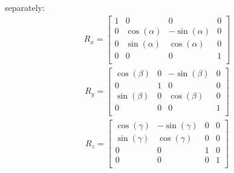 \documentclass[11pt]{report}
\begin{document}
separately:
\begin{align*}
R_x = 
  \begin{bmatrix}
  1             & 0            & 0             & 0 \\
  0             & \cos(\alpha) & -\sin(\alpha) & 0 \\
  0             & \sin(\alpha) & \cos(\alpha)  & 0 \\
  0             & 0            & 0             & 1 \\  
  \end{bmatrix}
\end{align*}
\begin{align*}
  R_y = 
  \begin{bmatrix}
    \cos(\beta) & 0            & -\sin(\beta)  & 0 \\
    0           & 1            & 0             & 0 \\
    \sin(\beta) & 0            & \cos(\beta)   & 0 \\
    0           & 0            & 0             & 1 \\
      \end{bmatrix}
\end{align*}
\begin{align*}
  R_z =
  \begin{bmatrix}
  \cos(\gamma)    & -\sin(\gamma)  & 0             & 0 \\
  \sin(\gamma)    & \cos(\gamma)   & 0             & 0 \\
  0             & 0            & 1             & 0 \\
  0             & 0            & 0             & 1 \\
      \end{bmatrix}
  \end{align*}
\end{document}

